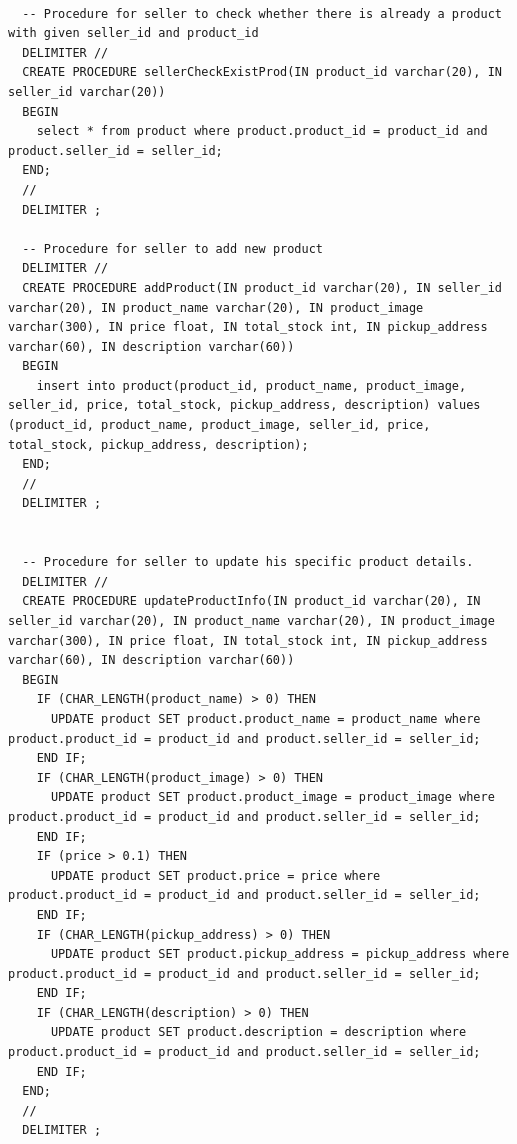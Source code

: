 \documentclass[a4paper,12pt]{article}
\begin{document}
\begin{verbatim}
  
  -- Procedure for seller to check whether there is already a product with given seller_id and product_id
  DELIMITER //
  CREATE PROCEDURE sellerCheckExistProd(IN product_id varchar(20), IN seller_id varchar(20))
  BEGIN
    select * from product where product.product_id = product_id and product.seller_id = seller_id;
  END;
  //
  DELIMITER ;
  
  -- Procedure for seller to add new product
  DELIMITER //
  CREATE PROCEDURE addProduct(IN product_id varchar(20), IN seller_id varchar(20), IN product_name varchar(20), IN product_image varchar(300), IN price float, IN total_stock int, IN pickup_address varchar(60), IN description varchar(60))
  BEGIN
    insert into product(product_id, product_name, product_image, seller_id, price, total_stock, pickup_address, description) values (product_id, product_name, product_image, seller_id, price, total_stock, pickup_address, description);
  END;
  //
  DELIMITER ;
  
  
  -- Procedure for seller to update his specific product details.
  DELIMITER //
  CREATE PROCEDURE updateProductInfo(IN product_id varchar(20), IN seller_id varchar(20), IN product_name varchar(20), IN product_image varchar(300), IN price float, IN total_stock int, IN pickup_address varchar(60), IN description varchar(60))
  BEGIN
    IF (CHAR_LENGTH(product_name) > 0) THEN
      UPDATE product SET product.product_name = product_name where product.product_id = product_id and product.seller_id = seller_id;
    END IF;
    IF (CHAR_LENGTH(product_image) > 0) THEN
      UPDATE product SET product.product_image = product_image where product.product_id = product_id and product.seller_id = seller_id;
    END IF;
    IF (price > 0.1) THEN
      UPDATE product SET product.price = price where product.product_id = product_id and product.seller_id = seller_id;
    END IF;
    IF (CHAR_LENGTH(pickup_address) > 0) THEN
      UPDATE product SET product.pickup_address = pickup_address where product.product_id = product_id and product.seller_id = seller_id;
    END IF;
    IF (CHAR_LENGTH(description) > 0) THEN
      UPDATE product SET product.description = description where product.product_id = product_id and product.seller_id = seller_id;
    END IF;
  END;
  //
  DELIMITER ;
  

\end{verbatim}
\end{document}

